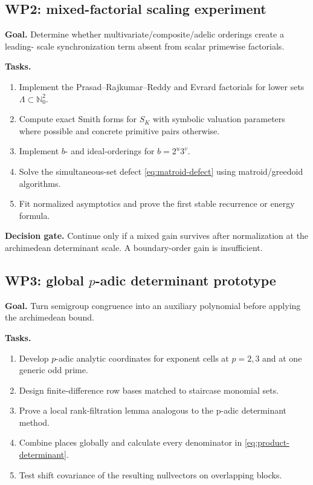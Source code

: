 \documentclass[10pt,letterpaper]{article}
\newcommand{\N}{\mathbb N}
\begin{document}
\subsection{WP2: mixed-factorial scaling experiment}

\textbf{Goal.}  Determine whether multivariate/composite/adelic orderings create a leading-
scale synchronization term absent from scalar primewise factorials.

\textbf{Tasks.}
\begin{enumerate}
\item Implement the Prasad--Rajkumar--Reddy and Evrard factorials for lower sets
\(\Lambda\subset\N_0^2\).
\item Compute exact Smith forms for \(S_K\) with symbolic valuation parameters where
possible and concrete primitive pairs otherwise.
\item Implement \(b\)- and ideal-orderings for \(b=2^u3^v\).
\item Solve the simultaneous-set defect \cref{eq:matroid-defect} using matroid/greedoid
algorithms.
\item Fit normalized asymptotics and prove the first stable recurrence or energy formula.
\end{enumerate}

\textbf{Decision gate.}  Continue only if a mixed gain survives after normalization at the
archimedean determinant scale.  A boundary-order gain is insufficient.

\subsection{WP3: global \texorpdfstring{\(p\)}{p}-adic determinant prototype}

\textbf{Goal.}  Turn semigroup congruence into an auxiliary polynomial before applying the
archimedean bound.

\textbf{Tasks.}
\begin{enumerate}
\item Develop \(p\)-adic analytic coordinates for exponent cells at \(p=2,3\) and at one
generic odd prime.
\item Design finite-difference row bases matched to staircase monomial sets.
\item Prove a local rank-filtration lemma analogous to the p-adic determinant method.
\item Combine places globally and calculate every denominator in
\cref{eq:product-determinant}.
\item Test shift covariance of the resulting nullvectors on overlapping blocks.
\end{enumerate}
\end{document}
